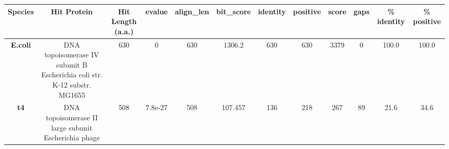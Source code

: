 \begin{tabular}{|c|c|c|c|c|c|c|c|c|c|c|c|} \hline
\textbf{Species} & \textbf{Hit Protein} & \textbf{Hit Length (a.a.)} & \textbf{evalue} & \textbf{align\_len} & \textbf{bit\_score} & \textbf{identity} & \textbf{positive} & \textbf{score} & \textbf{gaps} & \textbf{\% identity} & \textbf{\% positive} \\ \hline
\textbf{E.coli} & DNA topoisomerase IV subunit B Escherichia coli str. K-12 substr. MG1655 & 630 & 0 & 630 & 1306.2 & 630 & 630 & 3379 & 0 & 100.0 & 100.0\\
\textbf{t4} & DNA topoisomerase II large subunit Escherichia phage  & 508 & 7.8e-27 & 508 & 107.457 & 136 & 218 & 267 & 89 & 21.6 & 34.6\\
\hline \end{tabular}
